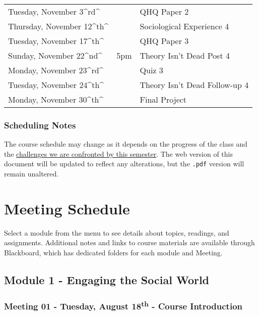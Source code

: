\documentclass[
]{book}
\begin{document}
\begin{table}
\begin{tabular}[t]{lll}
Tuesday, November 3\textasciicircum{}rd\textasciicircum{} &  & QHQ Paper 2\\
Thursday, November 12\textasciicircum{}th\textasciicircum{} &  & Sociological Experience 4\\
Tuesday, November 17\textasciicircum{}th\textasciicircum{} &  & QHQ Paper 3\\
\addlinespace
Sunday, November 22\textasciicircum{}nd\textasciicircum{} & 5pm & Theory Isn't Dead Post 4\\
Monday, November 23\textasciicircum{}rd\textasciicircum{} &  & Quiz 3\\
Tuesday, November 24\textasciicircum{}th\textasciicircum{} &  & Theory Isn't Dead Follow-up 4\\
Monday, November 30\textasciicircum{}th\textasciicircum{} &  & Final Project\\
\bottomrule
\end{tabular}
\end{table}

\hypertarget{scheduling-notes}{%
\subsection{Scheduling Notes}\label{scheduling-notes}}

The course schedule may change as it depends on the progress of the class and the \href{covid-19.html}{challenges we are confronted by this semester}. The web version of this document will be updated to reflect any alterations, but the \texttt{.pdf} version will remain unaltered.

\hypertarget{meeting-schedule}{%
\chapter{Meeting Schedule}\label{meeting-schedule}}

Select a module from the menu to see details about topics, readings, and assignments. Additional notes and links to course materials are available through Blackboard, which has dedicated folders for each module and Meeting.

\newpage

\hypertarget{module-1---engaging-the-social-world}{%
\section{Module 1 - Engaging the Social World}\label{module-1---engaging-the-social-world}}

\hypertarget{meeting-01---tuesday-august-18th---course-introduction}{%
\subsection*{\texorpdfstring{Meeting 01 - Tuesday, August 18\textsuperscript{th} - Course Introduction}{Meeting 01 - Tuesday, August 18th - Course Introduction}}\label{meeting-01---tuesday-august-18th---course-introduction}}
\end{document}
